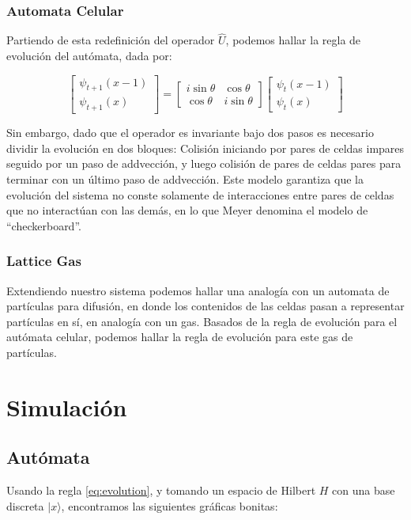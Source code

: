 \documentclass[12pts, letterpaper, twocolumn]{article}
\begin{document}
\subsubsection{Automata Celular}
Partiendo de esta redefinición del operador $\hat{U}$, podemos hallar la regla de 
evolución del autómata, dada por:

 \begin{equation}\label{eq:evolution}
    \left[ 
    \begin{matrix}
        \psi_{t+1}(x-1) \\
        \psi_{t+1}(x)
    \end{matrix}
    \right] = 
    \begin{bmatrix}
        i\sin\theta & \cos\theta \\
        \cos\theta & i\sin\theta
    \end{bmatrix}
    \left[ 
    \begin{matrix}
        \psi_{t}(x-1) \\
        \psi_{t}(x)
    \end{matrix}
    \right]
\end{equation}

Sin embargo, dado que el operador es invariante bajo dos pasos es necesario dividir la 
evolución en dos bloques: Colisión iniciando por pares de celdas impares seguido por un 
paso de addvección, y luego colisión de pares de celdas pares para terminar con un último 
paso de addvección. Este modelo garantiza que la evolución del sistema no conste solamente 
de interacciones entre pares de celdas que no interactúan con las demás, en lo que Meyer 
denomina el modelo de ``checkerboard''.

\subsubsection{Lattice Gas}
Extendiendo nuestro sistema podemos hallar una analogía con un automata de partículas para
difusión, en donde los contenidos de las celdas pasan a representar partículas en sí, 
en analogía con un gas. Basados de la regla de evolución para el autómata celular, podemos 
hallar la regla de evolución para este gas de partículas.

\section{Simulación}
\subsection{Autómata}
Usando la regla \ref{eq:evolution}, y tomando un espacio de Hilbert $H$ con una base 
discreta $|x\rangle$, encontramos las siguientes gráficas bonitas: 
\end{document}
